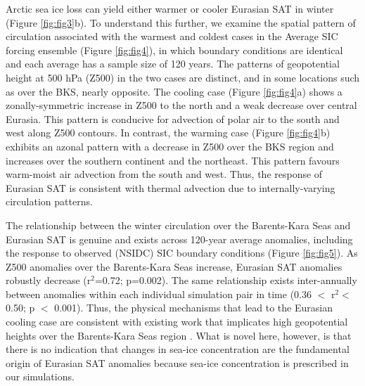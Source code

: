 \documentclass{nature}
\begin{document}
Arctic sea ice loss can yield either warmer or cooler Eurasian SAT in winter (Figure \ref{fig:fig3}b). To understand this further, we examine the spatial pattern of circulation associated with the warmest and coldest cases in the Average SIC forcing ensemble (Figure \ref{fig:fig4}), in which boundary conditions are identical and each average has a sample size of 120 years. The patterns of geopotential height at 500 hPa (Z500) in the two cases are distinct, and in some locations such as over the BKS, nearly opposite. The cooling case (Figure \ref{fig:fig4}a) shows a zonally-symmetric increase in Z500 to the north and a weak decrease over central Eurasia. This pattern is conducive for advection of polar air to the south and west along Z500 contours. In contrast, the warming case (Figure \ref{fig:fig4}b) exhibits an azonal pattern with a decrease in Z500 over the BKS region and increases over the southern continent and the northeast. This pattern favours warm-moist air advection from the south and west. Thus, the response of Eurasian SAT is consistent with thermal advection due to internally-varying circulation patterns. %

The relationship between the winter circulation over the Barents-Kara Seas and Eurasian SAT is genuine and exists across 120-year average anomalies, including the response to observed (NSIDC) SIC boundary conditions (Figure \ref{fig:fig5}). As Z500 anomalies over the Barents-Kara Seas increase, Eurasian SAT anomalies robustly decrease (r$^2$=0.72; p=0.002). The same relationship exists inter-annually between anomalies within each individual simulation pair in time (0.36 $<$ r$^2<$ 0.50; p $<$ 0.001). Thus, the physical mechanisms that lead to the Eurasian cooling case are consistent with existing work that implicates high geopotential heights over the Barents-Kara Seas region \cite{honda09,petoukhov10,mori14}. What is novel here, however, is that there is no indication that changes in sea-ice concentration are the fundamental origin of Eurasian SAT anomalies because sea-ice concentration is prescribed in our simulations. %
\end{document}
